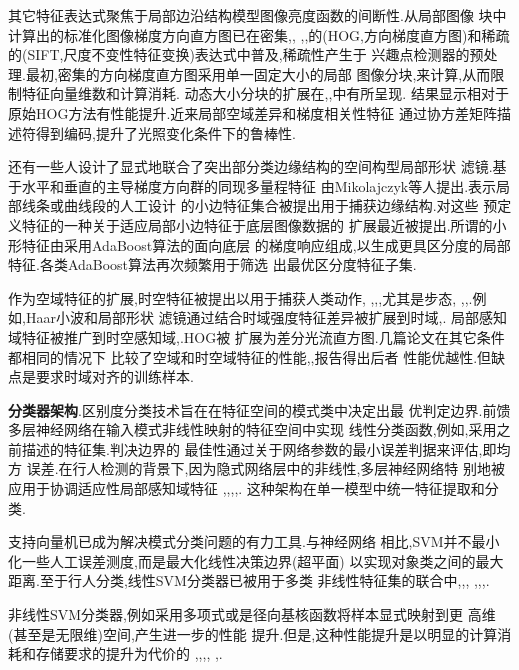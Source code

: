 \documentclass[10pt,letterpaper,journal,compsoc]{IEEEtran}
\begin{document}
其它特征表达式聚焦于局部边沿结构模型图像亮度函数的间断性.从局部图像
块中计算出的标准化图像梯度方向直方图已在密集\cite{bib11},\cite{bib62},
\cite{bib63},\cite{bib80},\cite{bib83}的(HOG,方向梯度直方图)和稀疏
\cite{bib42}的(SIFT,尺度不变性特征变换)表达式中普及,稀疏性产生于
兴趣点检测器的预处理.最初,密集的方向梯度直方图采用单一固定大小的局部
图像分块\cite{bib11},\cite{bib62}来计算,从而限制特征向量维数和计算消耗.
动态大小分块的扩展在\cite{bib63},\cite{bib80},\cite{bib83}中有所呈现.
结果显示相对于原始HOG方法有性能提升.近来局部空域差异和梯度相关性特征
通过协方差矩阵描述符得到编码,提升了光照变化条件下的鲁棒性\cite{bib71}.

还有一些人设计了显式地联合了突出部分类边缘结构的空间构型局部形状
滤镜.基于水平和垂直的主导梯度方向群的同现多量程特征
由Mikolajczyk等人提出\cite{bib45}.表示局部线条或曲线段的人工设计
的小边特征集合被提出用于捕获边缘结构\cite{bib76}.对这些
预定义特征的一种关于适应局部小边特征于底层图像数据\cite{bib60}的
扩展最近被提出.所谓的小形特征由采用AdaBoost算法的面向底层
的梯度响应组成,以生成更具区分度的局部特征.各类AdaBoost算法再次频繁用于筛选
出最优区分度特征子集.

作为空域特征的扩展,时空特征被提出以用于捕获人类动作\cite{bib12},
\cite{bib15},\cite{bib65},\cite{bib74},尤其是步态\cite{bib27},
\cite{bib38},\cite{bib56},\cite{bib75}.例如,Haar小波和局部形状
滤镜通过结合时域强度特征差异被扩展到时域\cite{bib65},\cite{bib74}.
局部感知域特征被推广到时空感知域\cite{bib27},\cite{bib75}.HOG被
扩展为差分光流直方图\cite{bib12}.几篇论文在其它条件都相同的情况下
比较了空域和时空域特征的性能\cite{bib12},\cite{bib74},报告得出后者
性能优越性.但缺点是要求时域对齐的训练样本.

\textbf{分类器架构}.区别度分类技术旨在在特征空间的模式类中决定出最
优判定边界.前馈多层神经网络在输入模式非线性映射的特征空间中实现
线性分类函数\cite{bib33},例如,采用之前描述的特征集.判决边界的
最佳性通过关于网络参数的最小误差判据来评估,即\cite{bib33}均方
误差.在行人检测的背景下,因为隐式网络层中的非线性,多层神经网络特
别地被应用于协调适应性局部感知域特征
\cite{bib19},\cite{bib23},\cite{bib49},\cite{bib68},\cite{bib75}.
这种架构在单一模型中统一特征提取和分类.

支持向量机\cite{bib73}已成为解决模式分类问题的有力工具.与神经网络
相比,SVM并不最小化一些人工误差测度,而是最大化线性决策边界(超平面)
以实现对象类之间的最大距离.至于行人分类,线性SVM分类器已被用于多类
非线性特征集的联合中\cite{bib11},\cite{bib12},\cite{bib51},
\cite{bib63},\cite{bib64},\cite{bib80},\cite{bib83}.

非线性SVM分类器,例如采用多项式或是径向基核函数将样本显式映射到更
高维(甚至是无限维)空间,产生进一步的性能
提升.但是,这种性能提升是以明显的计算消耗和存储要求的提升为代价的
\cite{bib2},\cite{bib48},\cite{bib49},\cite{bib51},\cite{bib53}
,\cite{bib68}.
\end{document}
